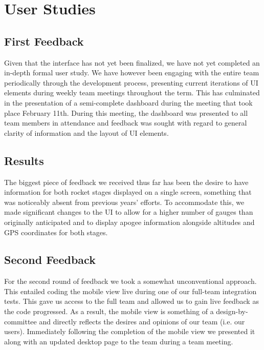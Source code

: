 \documentclass[journal,10pt,onecolumn,compsoc]{IEEEtran}
\begin{document}

\section{User Studies}

	\subsection{First Feedback}
		Given that the interface has not yet been finalized, we have not yet completed an in-depth formal user study.
		We have however been engaging with the entire team periodically through the development process, presenting current iterations of UI elements during weekly team meetings throughout the term.
		This has culminated in the presentation of a semi-complete dashboard during the meeting that took place February 11th.
		During this meeting, the dashboard was presented to all team members in attendance and feedback was sought with regard to general clarity of information and the layout of UI elements.
	
	\subsection{Results}
		The biggest piece of feedback we received thus far has been the desire to have information for both rocket stages displayed on a single screen, something that was noticeably absent from previous years' efforts.
		To accommodate this, we made significant changes to the UI to allow for a higher number of gauges than originally anticipated and to display apogee information alongside altitudes and GPS coordinates for both stages. 
	
  \subsection{Second Feedback}
    For the second round of feedback we took a somewhat unconventional approach.
    This entailed coding the mobile view live during one of our full-team integration tests. 
    This gave us access to the full team and allowed us to gain live feedback as the code progressed.
    As a result, the mobile view is something of a design-by-committee and directly reflects the desires and opinions of our team (i.e. our users).
    Immediately following the completion of the mobile view we presented it along with an updated desktop page to the team during a team meeting.
    
\end{document}
